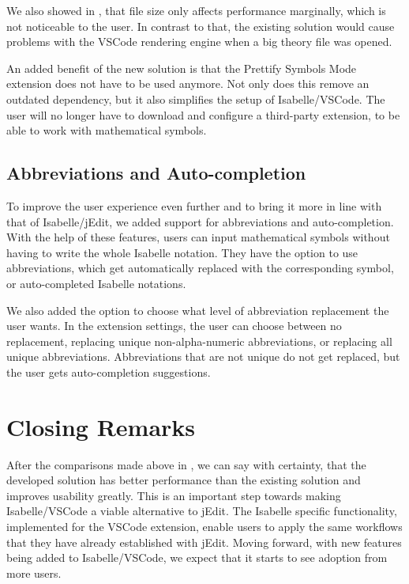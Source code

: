 We also showed in , that file size only affects performance marginally, which is not noticeable to the user. In contrast to that, the existing solution would cause problems with the VSCode rendering engine when a big theory file was opened.

An added benefit of the new solution is that the Prettify Symbols Mode extension does not have to be used anymore. Not only does this remove an outdated dependency, but it also simplifies the setup of Isabelle/VSCode. The user will no longer have to download and configure a third-party extension, to be able to work with mathematical symbols.

\subsection{Abbreviations and Auto-completion}
To improve the user experience even further and to bring it more in line with that of Isabelle/jEdit, we added support for abbreviations and auto-completion. With the help of these features, users can input mathematical symbols without having to write the whole Isabelle notation.  They have the option to use abbreviations, which get automatically replaced with the corresponding symbol, or auto-completed Isabelle notations.

We also added the option to choose what level of abbreviation replacement the user wants. In the extension settings, the user can choose between no replacement, replacing unique non-alpha-numeric abbreviations, or replacing all unique abbreviations. Abbreviations that are not unique do not get replaced, but the user gets auto-completion suggestions.


\section{Closing Remarks}
After the comparisons made above in , we can say with certainty, that the developed solution has better performance than the existing solution and improves usability greatly. This is an important step towards making Isabelle/VSCode a viable alternative to jEdit. The Isabelle specific functionality, implemented for the VSCode extension, enable users to apply the same workflows that they have already established with jEdit. Moving forward, with new features being added to Isabelle/VSCode, we expect that it starts to see adoption from more users.